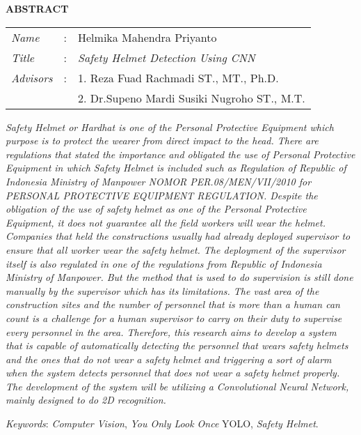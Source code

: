 \begin{center}
  \large\textbf{ABSTRACT}
\end{center}


\vspace{2ex}

\begingroup
  \setlength{\tabcolsep}{0pt}

  \noindent
  \begin{tabularx}{\textwidth}{l >{\centering}m{3em} X}
    \emph{Name}     &:& Helmika Mahendra Priyanto \\

    \emph{Title}    &:& \emph{Safety Helmet Detection Using CNN} \\

    \emph{Advisors} &:& 1. Reza Fuad Rachmadi ST., MT., Ph.D. \\
                    & & 2. Dr.Supeno Mardi Susiki Nugroho ST., M.T. \\
  \end{tabularx}
\endgroup

\par \emph{
  Safety Helmet or Hardhat is one of the Personal Protective Equipment which purpose is to protect the wearer from direct impact
  to the head. There are regulations that stated the importance and obligated the use of Personal Protective Equipment in which 
  Safety Helmet is included such as Regulation of Republic of Indonesia Ministry of Manpower \emph{NOMOR PER.08/MEN/VII/2010} for
  PERSONAL PROTECTIVE EQUIPMENT REGULATION. Despite the obligation of the use of safety helmet as one of the Personal Protective Equipment,
  it does not guarantee all the field workers will wear the helmet. Companies that held the constructions usually had already deployed
  supervisor to ensure that all worker wear the safety helmet. The deployment of the supervisor itself is also regulated in one of the regulations from
  Republic of Indonesia Ministry of Manpower. But the method that is used to do supervision
  is still done manually by the supervisor which has its limitations. The vast area of the 
  construction sites and the number of personnel that is more than a 
  human can count is a challenge for a human supervisor to carry on 
  their duty to supervise every personnel in the area.
  Therefore, this research aims to develop a system that is capable of 
  automatically detecting the personnel that wears safety helmets and the 
  ones that do not wear a safety helmet and triggering a sort of alarm when the system 
  detects personnel that does not wear a safety helmet properly. 
  The development of the system will be utilizing a Convolutional Neural Network, mainly designed to do 2D recognition.
}


\emph{Keywords}: \emph{Computer Vision}, \emph{You Only Look Once} YOLO, \emph{Safety Helmet}.
